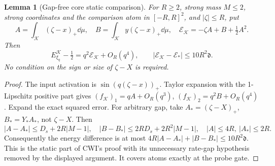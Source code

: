 \documentclass[11pt]{article}
\numberwithin{equation}{section}
\newtheorem{lemma}[theorem]{Lemma}
\newcommand{\KK}{\mathcal K}\newcommand{\BB}{\mathcal B}
\newcommand{\dist}{\mathfrak d}\newcommand{\one}{\mathbf1}
\begin{document}
\begin{lemma}[Gap-free core static comparison]
\label{an07fwcv1:static}
For \(R\ge2\), strong mass \(M\le2\), strong coordinates
and the comparison atom in \([-R,R]^2\), and \(|\zeta|\le R\),
put
\[
 A=\int_\KK(\zeta-x)_+\dd\mu,\quad
 B=\int_\KK y(\zeta-x)_+\dd\mu,\quad
 \mathcal E_\KK=-\zeta A+B+\tfrac12A^2.
\]
Then
\begin{equation}
 E_{\xi_q}^{\KK}-\tfrac12=q^2\mathcal E_\KK+O_R(q^4),
 \qquad |\mathcal E_\KK-\mathcal E_*|\le10R^2\dist.
 \label{an07fwcv1:staticcompare}
\end{equation}
No condition on the sign or size of \(\zeta-X\) is required.
\end{lemma}
\begin{proof}
The input activation is \(\sin(q(\zeta-x))_+\).
Taylor expansion with the 1-Lipschitz positive part gives
\((f_\KK)_1=qA+O_R(q^3)\),
\((f_\KK)_2=q^2B+O_R(q^4)\). Expand the exact squared error.
For arbitrary gap, take \(A_*=(\zeta-X)_+\),
\(B_*=Y_*A_*\), not \(\zeta-X\).
Then
\[
 |A-A_*|\le D_s+2R|M-1|,\quad
 |B-B_*|\le2RD_s+2R^2|M-1|,
 \quad |A|\le4R,\ |A_*|\le2R.
\]
Consequently the energy difference is at most
\(4R|A-A_*|+|B-B_*|\le10R^2\dist\).
This is the static part of CWI's proof with its unnecessary
rate-gap hypothesis removed by the displayed argument.
It covers atoms exactly at the probe gate.
\end{proof}
\end{document}
